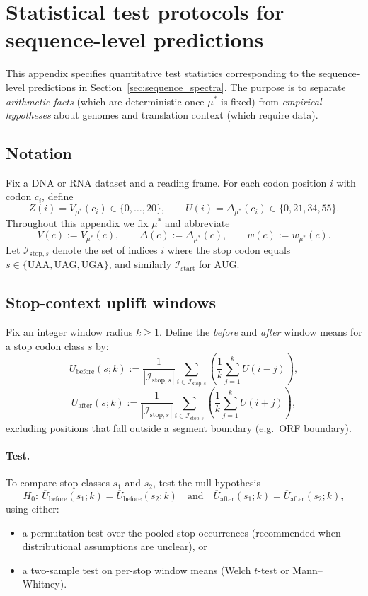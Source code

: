 \section{Statistical test protocols for sequence-level predictions}
\label{app:stat_tests}

This appendix specifies quantitative test statistics corresponding to the sequence-level predictions in Section~\ref{sec:sequence_spectra}.
The purpose is to separate \emph{arithmetic facts} (which are deterministic once $\mu^\ast$ is fixed) from \emph{empirical hypotheses} about genomes and translation context (which require data).

\subsection{Notation}
Fix a DNA or RNA dataset and a reading frame. For each codon position $i$ with codon $c_i$, define
\[
Z(i)=V_{\mu^\ast}(c_i)\in\{0,\dots,20\},\qquad
U(i)=\Delta_{\mu^\ast}(c_i)\in\{0,21,34,55\}.
\]
Throughout this appendix we fix $\mu^\ast$ and abbreviate
\[
V(c):=V_{\mu^\ast}(c),\qquad \Delta(c):=\Delta_{\mu^\ast}(c),\qquad w(c):=w_{\mu^\ast}(c).
\]
Let $\mathcal{I}_{\mathrm{stop},s}$ denote the set of indices $i$ where the stop codon equals $s\in\{\mathrm{UAA,UAG,UGA}\}$, and similarly $\mathcal{I}_{\mathrm{start}}$ for $\mathrm{AUG}$.

\subsection{Stop-context uplift windows}
\label{app:stop_context_windows}

Fix an integer window radius $k\ge 1$.
Define the \emph{before} and \emph{after} window means for a stop codon class $s$ by:
\[
\overline{U}_{\mathrm{before}}(s;k)
:=
\frac{1}{|\mathcal{I}_{\mathrm{stop},s}|}
\sum_{i\in\mathcal{I}_{\mathrm{stop},s}}
\left(
\frac{1}{k}\sum_{j=1}^{k} U(i-j)
\right),
\]
\[
\overline{U}_{\mathrm{after}}(s;k)
:=
\frac{1}{|\mathcal{I}_{\mathrm{stop},s}|}
\sum_{i\in\mathcal{I}_{\mathrm{stop},s}}
\left(
\frac{1}{k}\sum_{j=1}^{k} U(i+j)
\right),
\]
excluding positions that fall outside a segment boundary (e.g.\ ORF boundary).

\paragraph{Test.}
To compare stop classes $s_1$ and $s_2$, test the null hypothesis
\[
H_0:\ \overline{U}_{\mathrm{before}}(s_1;k)=\overline{U}_{\mathrm{before}}(s_2;k)
\quad\text{and}\quad
\overline{U}_{\mathrm{after}}(s_1;k)=\overline{U}_{\mathrm{after}}(s_2;k),
\]
using either:
\begin{itemize}
\item a permutation test over the pooled stop occurrences (recommended when distributional assumptions are unclear), or
\item a two-sample test on per-stop window means (Welch $t$-test or Mann--Whitney).
\end{itemize}

